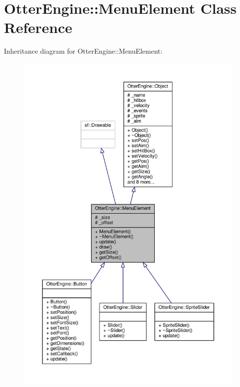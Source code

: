 \hypertarget{class_otter_engine_1_1_menu_element}{}\section{Otter\+Engine\+:\+:Menu\+Element Class Reference}
\label{class_otter_engine_1_1_menu_element}


Inheritance diagram for Otter\+Engine\+:\+:Menu\+Element\+:\nopagebreak
\begin{figure}[H]
\begin{center}
\leavevmode
\includegraphics[width=350pt]{db/d68/class_otter_engine_1_1_menu_element__inherit__graph}
\end{center}
\end{figure}


